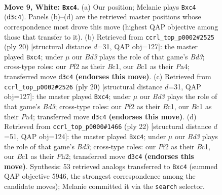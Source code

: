 \documentclass[11pt]{article}
\begin{document}
\clearpage

\begin{figure}[p]\centering
\begin{subfigure}{0.46\textwidth}\centering
\resizebox{\linewidth}{!}{%
\newchessgame
\chessboard[
  setfen={rnbq1rk1/pp3ppp/4pn2/2p5/2pP4/2PBPN2/P4PPP/R1BQ1RK1 w - - 0 9},
  showmover=false,
  pgfstyle=straightmove, color=movearrow, markmove={d3-c4}
]}
\caption{}
\end{subfigure}\hfill
\begin{subfigure}{0.46\textwidth}\centering
\resizebox{\linewidth}{!}{%
\newchessgame
\chessboard[
  setfen={r1bq1rk1/pp3pp1/2n1pn1p/2p5/P1pP4/2PBPN2/5PPP/R1BQ1RK1 w - - 0 11},
  showmover=false,
  pgfstyle=straightmove, color=movearrow, markmove={d3-c4}
]}
\caption{}
\end{subfigure}
\\[4pt]
\begin{subfigure}{0.46\textwidth}\centering
\resizebox{\linewidth}{!}{%
\newchessgame
\chessboard[
  setfen={r1bq1rk1/pp3pp1/2n1pn1p/2p5/P1pP4/2PBPN2/5PPP/R1BQ1RK1 w - - 0 11},
  showmover=false,
  pgfstyle=straightmove, color=movearrow, markmove={d3-c4}
]}
\caption{}
\end{subfigure}\hfill
\begin{subfigure}{0.46\textwidth}\centering
\resizebox{\linewidth}{!}{%
\newchessgame
\chessboard[
  setfen={r1bq1rk1/pp3ppp/4pn2/2p5/2pP4/P1PBP3/5PPP/R1BQ1RK1 w - - 0 12},
  showmover=false,
  pgfstyle=straightmove, color=movearrow, markmove={d3-c4}
]}
\caption{}
\end{subfigure}
\caption{\textbf{Move 9, White: \texttt{Bxc4}.} (a) Our position; Melanie plays \texttt{Bxc4} (\texttt{d3c4}). Panels (b)--(d) are the retrieved master positions whose correspondence most drove this move (highest QAP objective among those that transfer to it). (b) Retrieved from \texttt{ccrl\_top\_p0002\#2525} (ply 20) [structural distance $d$=31, QAP obj=127]: the master played \texttt{Bxc4}; under $\mu$ our \emph{Bd3} plays the role of that game's \emph{Bd3}; cross-type roles: our \emph{P}f2 as their \emph{B}c1, our \emph{B}c1 as their \emph{P}a4; transferred move \texttt{d3c4} \textbf{(endorses this move)}. (c) Retrieved from \texttt{ccrl\_top\_p0002\#2526} (ply 20) [structural distance $d$=31, QAP obj=127]: the master played \texttt{Bxc4}; under $\mu$ our \emph{Bd3} plays the role of that game's \emph{Bd3}; cross-type roles: our \emph{P}f2 as their \emph{B}c1, our \emph{B}c1 as their \emph{P}a4; transferred move \texttt{d3c4} \textbf{(endorses this move)}. (d) Retrieved from \texttt{ccrl\_top\_p0000\#1466} (ply 22) [structural distance $d$=51, QAP obj=124]: the master played \texttt{Bxc4}; under $\mu$ our \emph{Bd3} plays the role of that game's \emph{Bd3}; cross-type roles: our \emph{P}f2 as their \emph{B}c1, our \emph{B}c1 as their \emph{P}h2; transferred move \texttt{d3c4} \textbf{(endorses this move)}. Synthesis: 53 retrieved analogs transferred to \texttt{Bxc4} (summed QAP objective 5946, the strongest correspondence among the candidate moves); Melanie committed it via the \texttt{search} selector.}
\label{fig:thought-m16}
\end{figure}
\end{document}
